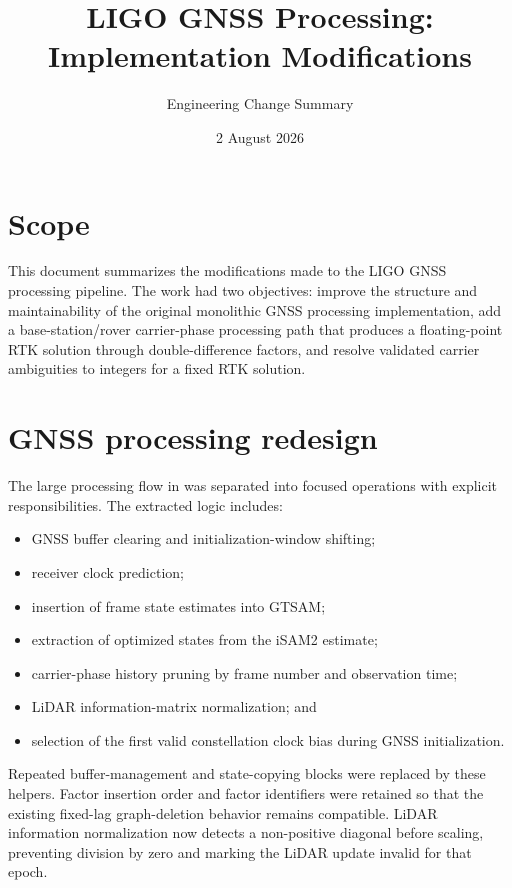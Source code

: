 \documentclass[11pt,a4paper]{article}
\title{LIGO GNSS Processing: Implementation Modifications}
\author{Engineering Change Summary}
\date{2 August 2026}
\newcommand{\code}[1]{\texttt{\detokenize{#1}}}
\begin{document}
\maketitle

\section{Scope}

This document summarizes the modifications made to the LIGO GNSS processing
pipeline.  The work had two objectives: improve the structure and
maintainability of the original monolithic GNSS processing implementation,
add a base-station/rover carrier-phase processing path that produces a
floating-point RTK solution through double-difference factors, and resolve
validated carrier ambiguities to integers for a fixed RTK solution.

\section{GNSS processing redesign}

The large processing flow in \code{src/GNSS_Processing_fg.cpp} was separated
into focused operations with explicit responsibilities.  The extracted logic
includes:

\begin{itemize}[leftmargin=*]
  \item GNSS buffer clearing and initialization-window shifting;
  \item receiver clock prediction;
  \item insertion of frame state estimates into GTSAM;
  \item extraction of optimized states from the iSAM2 estimate;
  \item carrier-phase history pruning by frame number and observation time;
  \item LiDAR information-matrix normalization; and
  \item selection of the first valid constellation clock bias during GNSS
        initialization.
\end{itemize}

Repeated buffer-management and state-copying blocks were replaced by these
helpers.  Factor insertion order and factor identifiers were retained so that
the existing fixed-lag graph-deletion behavior remains compatible.  LiDAR
information normalization now detects a non-positive diagonal before scaling,
preventing division by zero and marking the LiDAR update invalid for that
epoch.
\end{document}
